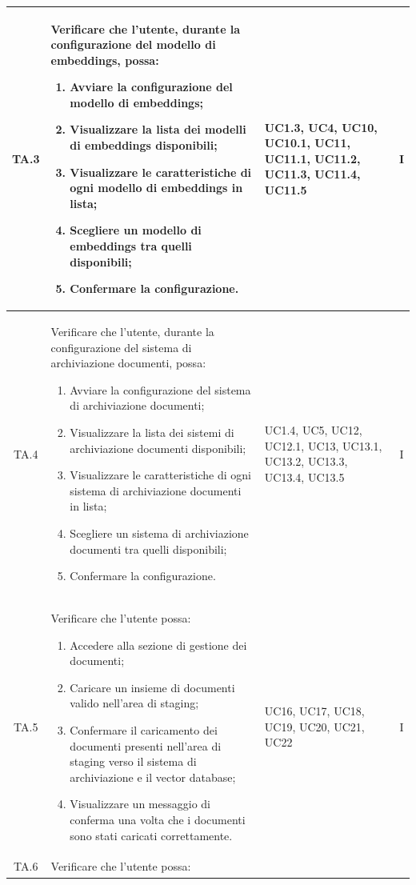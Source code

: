 \begin{xltabular}{\textwidth}{|c|X|p{2.5cm}|c|}
\hline
TA.3 & Verificare che l'utente, durante la configurazione del modello di embeddings, possa:
\begin{enumerate}
    \item Avviare la configurazione del modello di embeddings;
    \item Visualizzare la lista dei modelli di embeddings disponibili;
    \item Visualizzare le caratteristiche di ogni modello di embeddings in lista;
    \item Scegliere un modello di embeddings tra quelli disponibili;
    \item Confermare la configurazione.
\end{enumerate}
& UC1.3, UC4, UC10, UC10.1, UC11, UC11.1, UC11.2, UC11.3, UC11.4, UC11.5 & I \\
\hline
TA.4 & Verificare che l'utente, durante la configurazione del sistema di archiviazione documenti, possa:
\begin{enumerate}
    \item Avviare la configurazione del sistema di archiviazione documenti;
    \item Visualizzare la lista dei sistemi di archiviazione documenti disponibili;
    \item Visualizzare le caratteristiche di ogni sistema di archiviazione documenti in lista;
    \item Scegliere un sistema di archiviazione documenti tra quelli disponibili;
    \item Confermare la configurazione.
\end{enumerate}
& UC1.4, UC5, UC12, UC12.1, UC13, UC13.1, UC13.2, UC13.3, UC13.4, UC13.5 & I \\
\hline
TA.5 & Verificare che l'utente possa:
\begin{enumerate}
    \item Accedere alla sezione di gestione dei documenti;
    \item Caricare un insieme di documenti valido nell'area di staging;
    \item Confermare il caricamento dei documenti presenti nell'area di staging verso il sistema di archiviazione e il vector database;
    \item Visualizzare un messaggio di conferma una volta che i documenti sono stati caricati correttamente.
\end{enumerate}
& UC16, UC17, UC18, UC19, UC20, UC21, UC22 & I \\
\hline
TA.6 & Verificare che l'utente possa:

\end{xltabular}
